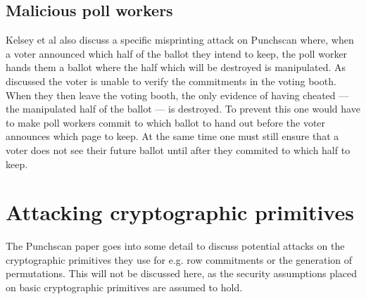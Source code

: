 \subsection{Malicious poll workers}

Kelsey et al\autocite{kelseyAttackingPaperBasedE2E2010} also discuss a specific
misprinting attack on Punchscan where, when a voter announced which half of
the ballot they intend to keep, the poll worker hands them a ballot where the
half which will be destroyed is manipulated. As discussed the voter is unable
to verify the commitments in the voting booth. When they then leave the voting
booth, the only evidence of having cheated --- the manipulated half of the
ballot --- is destroyed. To prevent this one would have to make poll workers
commit to which ballot to hand out before the voter announces which page to
keep. At the same time one must still ensure that a voter does not see their
future ballot until after they commited to which half to keep.

\section{Attacking cryptographic primitives}

The Punchscan paper goes into some detail to discuss potential attacks on the
cryptographic primitives they use for e.g. row commitments or the generation of
permutations. This will not be discussed here, as the security assumptions
placed on basic cryptographic primitives are assumed to hold.
